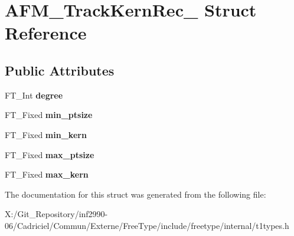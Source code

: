 \hypertarget{struct_a_f_m___track_kern_rec__}{\section{A\-F\-M\-\_\-\-Track\-Kern\-Rec\-\_\- Struct Reference}
\label{struct_a_f_m___track_kern_rec__}
}
\subsection*{Public Attributes}
\begin{DoxyCompactItemize}
\item 
\hypertarget{struct_a_f_m___track_kern_rec___a15272593c1a0ea05ca3687e7c2de26b6}{F\-T\-\_\-\-Int {\bfseries degree}}\label{struct_a_f_m___track_kern_rec___a15272593c1a0ea05ca3687e7c2de26b6}

\item 
\hypertarget{struct_a_f_m___track_kern_rec___a7b1e7fd74d92dcf2b89fee7f74d4fdba}{F\-T\-\_\-\-Fixed {\bfseries min\-\_\-ptsize}}\label{struct_a_f_m___track_kern_rec___a7b1e7fd74d92dcf2b89fee7f74d4fdba}

\item 
\hypertarget{struct_a_f_m___track_kern_rec___aee6f40c722e14ee2fb17948ce19d0499}{F\-T\-\_\-\-Fixed {\bfseries min\-\_\-kern}}\label{struct_a_f_m___track_kern_rec___aee6f40c722e14ee2fb17948ce19d0499}

\item 
\hypertarget{struct_a_f_m___track_kern_rec___a2b22a268fb0654a035ec59d3dfa3dfa4}{F\-T\-\_\-\-Fixed {\bfseries max\-\_\-ptsize}}\label{struct_a_f_m___track_kern_rec___a2b22a268fb0654a035ec59d3dfa3dfa4}

\item 
\hypertarget{struct_a_f_m___track_kern_rec___a8e25a36b738a2de3fa5c08e477b5a6a2}{F\-T\-\_\-\-Fixed {\bfseries max\-\_\-kern}}\label{struct_a_f_m___track_kern_rec___a8e25a36b738a2de3fa5c08e477b5a6a2}

\end{DoxyCompactItemize}


The documentation for this struct was generated from the following file\-:\begin{DoxyCompactItemize}
\item 
X\-:/\-Git\-\_\-\-Repository/inf2990-\/06/\-Cadriciel/\-Commun/\-Externe/\-Free\-Type/include/freetype/internal/t1types.\-h\end{DoxyCompactItemize}
